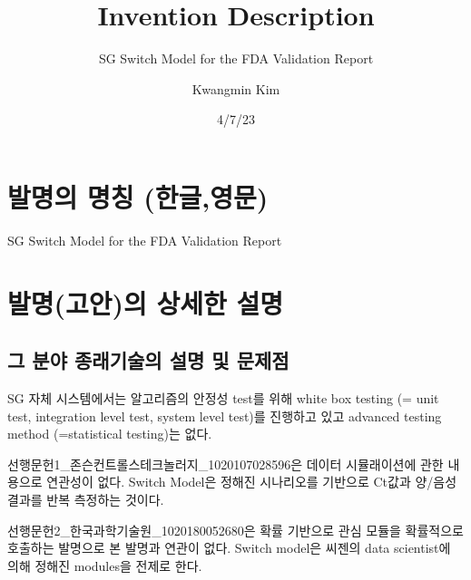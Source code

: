 \documentclass[
  letterpaper,
  DIV=11,
  numbers=noendperiod]{scrartcl}
\title{Invention Description}
\subtitle{SG Switch Model for the FDA Validation Report}
\author{Kwangmin Kim}
\date{4/7/23}
\renewcommand*\contentsname{Table of contents}
\newcommand\contentsname{Table of contents}
\begin{document}
\maketitle
\ifdefined\Shaded\renewenvironment{Shaded}{\begin{tcolorbox}[frame hidden, breakable, interior hidden, borderline west={3pt}{0pt}{shadecolor}, enhanced, boxrule=0pt, sharp corners]}{\end{tcolorbox}}\fi

\renewcommand*\contentsname{Table of contents}
{
\hypersetup{linkcolor=}
\setcounter{tocdepth}{3}
\tableofcontents
}
\hypertarget{uxbc1cuxba85uxc758-uxba85uxce6d-uxd55cuxae00uxc601uxbb38}{%
\section{발명의 명칭
(한글,영문)}\label{uxbc1cuxba85uxc758-uxba85uxce6d-uxd55cuxae00uxc601uxbb38}}

SG Switch Model for the FDA Validation Report

\hypertarget{uxbc1cuxba85uxace0uxc548uxc758-uxc0c1uxc138uxd55c-uxc124uxba85}{%
\section{발명(고안)의 상세한
설명}\label{uxbc1cuxba85uxace0uxc548uxc758-uxc0c1uxc138uxd55c-uxc124uxba85}}

\hypertarget{uxadf8-uxbd84uxc57c-uxc885uxb798uxae30uxc220uxc758-uxc124uxba85-uxbc0f-uxbb38uxc81cuxc810}{%
\subsection{그 분야 종래기술의 설명 및
문제점}\label{uxadf8-uxbd84uxc57c-uxc885uxb798uxae30uxc220uxc758-uxc124uxba85-uxbc0f-uxbb38uxc81cuxc810}}

SG 자체 시스템에서는 알고리즘의 안정성 test를 위해 white box testing (=
unit test, integration level test, system level test)를 진행하고 있고
advanced testing method (=statistical testing)는 없다.

선행문헌1\_존슨컨트롤스테크놀러지\_1020107028596은 데이터 시뮬래이션에
관한 내용으로 연관성이 없다. Switch Model은 정해진 시나리오를 기반으로
Ct값과 양/음성 결과를 반복 측정하는 것이다.

선행문헌2\_한국과학기술원\_1020180052680은 확률 기반으로 관심 모듈을
확률적으로 호출하는 발명으로 본 발명과 연관이 없다. Switch model은
씨젠의 data scientist에 의해 정해진 modules을 전제로 한다.
\end{document}

